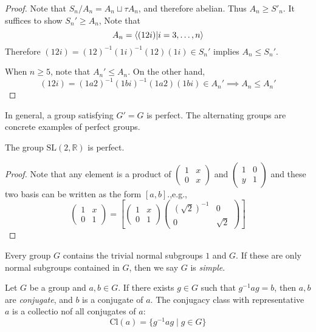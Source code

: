 \begin{proof}
Note that $S_n/A_n=A_n\sqcup\tau A_n$, and therefore abelian. Thus $A_n\ge S'_n$. It suffices to show $S_n'\ge A_n$, Note that
\[
A_n=\langle (12i)|i=3,\dots,n\rangle
\]
Therefore $(12i)=(12)^{-1}(1i)^{-1}(12)(1i)\in S_n'$ implies $A_n\le S_n'$.

When $n\ge 5$, note that $A_n'\le A_n$. On the other hand,
\[
(12i) = (1a2)^{-1}(1bi)^{-1}(1a2)(1bi)\in A_n'\implies
A_n\le A_n'
\]
\end{proof}
\begin{remark}
In general, a group satisfying $G'=G$ is perfect. The alternating groups are concrete examples of perfect groups.
\end{remark}
\begin{proposition}
The group $\mbox{SL}(2,\mathbb{R})$ is perfect.
\end{proposition}
\begin{proof}
Note that any element is a product of $\begin{pmatrix}
1&x\\0&x
\end{pmatrix}$ and $\begin{pmatrix}
1&0\\y&1
\end{pmatrix}$ and these two basis can be written as the form $[a,b]$.,e.g.,
\[
\begin{pmatrix}
1&x\\0&1
\end{pmatrix}=[\begin{pmatrix}
1&x\\0&1
\end{pmatrix}\begin{pmatrix}
(\sqrt{2})^{-1}&0\\0&\sqrt{2}
\end{pmatrix}]
\]
\end{proof}
\begin{definition}[Simple]
Every group $G$ contains the trivial normal subgroups $1$ and $G$. If these are only normal subgroups contained in $G$, then we say $G$ is \emph{simple}.
\end{definition}
\begin{definition}
Let $G$ be a group and $a,b\in G$. If there exists $g\in G$ such that $g^{-1}ag=b$, then $a,b$ are \emph{conjugate}, and $b$ is a conjugate of $a$.  The conjugacy class with representative $a$ is a collectio nof all conjugates of $a$:
\[
\mbox{Cl}(a)=\{g^{-1}ag\mid g\in G\}
\]
\end{definition}
